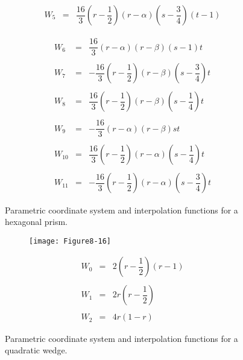 \begin{figure}[!htb]
\begin{subfigure}{0.48\linewidth}
\begin{equation*}
\begin{array}{lll}
		W_5 &=& \dfrac{16}{3}(r - \dfrac{1}{2})(r - \alpha)(s - \dfrac{3}{4})(t - 1)
		\end{array}
		\end{equation*}
	\end{subfigure}%
	\hfill
	\begin{subfigure}{0.48\linewidth}
		\centering
		\begin{equation*}
		\begin{array}{lll}
		W_6 &=& \dfrac{16}{3}(r - \alpha)(r - \beta)(s - 1)t \\ \\
		W_7 &=&-\dfrac{16}{3}(r - \dfrac{1}{2})(r - \beta)(s - \dfrac{3}{4})t \\ \\
		W_8 &=&  \dfrac{16}{3}(r - \dfrac{1}{2})(r - \beta)(s - \dfrac{1}{4})t \\ \\
		W_9 &=& -\dfrac{16}{3}(r - \alpha)(r - \beta)st \\ \\
		W_{10} &=&  \dfrac{16}{3}(r - \dfrac{1}{2})(r - \alpha)(s - \dfrac{1}{4})t \\ \\
		W_{11} &=& -\dfrac{16}{3}(r - \dfrac{1}{2})(r - \alpha)(s - \dfrac{3}{4})t
		\end{array}
		\end{equation*}
	\end{subfigure}%
\caption{Parametric coordinate system and interpolation functions for a hexagonal prism.}
\label{fig:Figure8-15}
\end{figure}

\begin{figure}[!htb]
	\centering
	\begin{subfigure}{0.48\linewidth}
		\centering
		\texttt{[image: Figure8-16]}
		\caption*{}
	\end{subfigure}
	\hfill
	\begin{subfigure}{0.48\linewidth}
		\centering
		\begin{equation*}
		\begin{array}{lll}
		W_0 &=& 2 \left( r - \dfrac{1}{2}\right)(r - 1) \\ \\
		W_1 &=& 2 r \left( r - \dfrac{1}{2}\right) \\ \\
		W_2 &=& 4 r (1 - r)	
		\end{array}
		\end{equation*}
	\end{subfigure}%
	\caption{Parametric coordinate system and interpolation functions for a quadratic wedge.}
	\label{fig:Figure8-16}
\end{figure}

